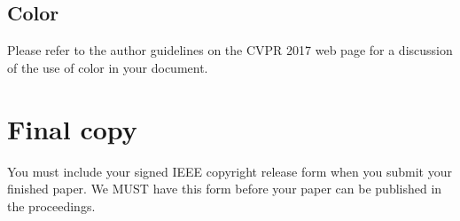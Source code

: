 \documentclass[12pt,letterpaper]{article}
\begin{document}
\subsection{Color}

Please refer to the author guidelines on the CVPR 2017 web page for a discussion
of the use of color in your document.

\section{Final copy}

You must include your signed IEEE copyright release form when you submit
your finished paper. We MUST have this form before your paper can be
published in the proceedings.


{\small


}
\end{document}
